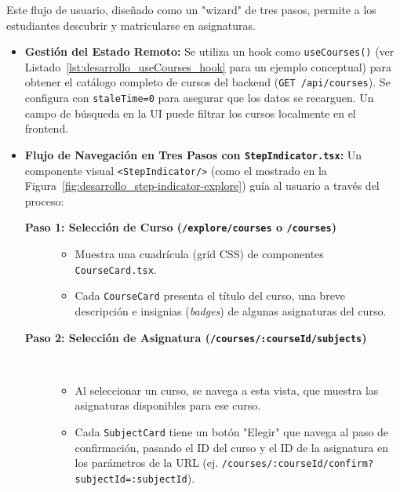 Este flujo de usuario, diseñado como un "wizard" de tres pasos, permite a los estudiantes descubrir y matricularse en asignaturas.
\begin{itemize}[leftmargin=*]
  \item \textbf{Gestión del Estado Remoto:} Se utiliza un hook como \texttt{useCourses()} (ver Listado~\ref{lst:desarrollo_useCourses_hook} para un ejemplo conceptual) para obtener el catálogo completo de cursos del backend (\texttt{GET /api/courses}). Se configura con \texttt{staleTime=0} para asegurar que los datos se recarguen. Un campo de búsqueda en la UI puede filtrar los cursos localmente en el frontend.

  \item \textbf{Flujo de Navegación en Tres Pasos con \texttt{StepIndicator.tsx}:} Un componente visual \texttt{<StepIndicator/>} (como el mostrado en la Figura~\ref{fig:desarrollo_step-indicator-explore}) guía al usuario a través del proceso:
        \begin{description}
          \item[\textbf{Paso 1: Selección de Curso (\texttt{/explore/courses} o \texttt{/courses})}]
            \begin{itemize}[leftmargin=*, labelsep=0.5em] \\
              \item Muestra una cuadrícula (grid CSS) de componentes \texttt{CourseCard.tsx}.
              \item Cada \texttt{CourseCard} presenta el título del curso, una breve descripción e insignias (\emph{badges}) de algunas asignaturas del curso.
            \end{itemize}
        
          \item[\textbf{Paso 2: Selección de Asignatura (\texttt{/courses/:courseId/subjects})}]\\
            \begin{itemize}[leftmargin=*, labelsep=0.5em]
              \item Al seleccionar un curso, se navega a esta vista, que muestra las asignaturas disponibles para ese curso.
              \item Cada \texttt{SubjectCard} tiene un botón "Elegir" que navega al paso de confirmación, pasando el ID del curso y el ID de la asignatura en los parámetros de la URL (ej. \texttt{/courses/:courseId/confirm?subjectId=:subjectId}).
            \end{itemize}
        

\end{description}
\end{itemize}
